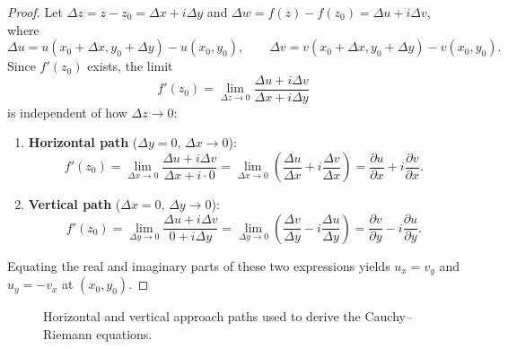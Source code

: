 \documentclass[11pt,a4paper]{article}
\theoremstyle{breakdef}
\theoremstyle{breakthm}
\begin{document}
\begin{proof}
Let $\Delta z = z - z_0 = \Delta x + i\Delta y$ and $\Delta w = f(z) - f(z_0) = \Delta u + i\Delta v$, where
\[
    \Delta u = u(x_0 + \Delta x, y_0 + \Delta y) - u(x_0, y_0), \qquad \Delta v = v(x_0 + \Delta x, y_0 + \Delta y) - v(x_0, y_0).
\]
Since $f'(z_0)$ exists, the limit
\[
    f'(z_0) = \lim_{\Delta z \to 0} \frac{\Delta u + i\Delta v}{\Delta x + i\Delta y}
\]
is independent of how $\Delta z \to 0$:
\begin{enumerate}
    \item \textbf{Horizontal path} ($\Delta y = 0$, $\Delta x \to 0$):
    \[
        f'(z_0) = \lim_{\Delta x \to 0} \frac{\Delta u + i\Delta v}{\Delta x + i\cdot 0} = \lim_{\Delta x \to 0} \left(\frac{\Delta u}{\Delta x} + i\frac{\Delta v}{\Delta x}\right) = \frac{\partial u}{\partial x} + i\frac{\partial v}{\partial x}.
    \]
    \item \textbf{Vertical path} ($\Delta x = 0$, $\Delta y \to 0$):
    \[
        f'(z_0) = \lim_{\Delta y \to 0} \frac{\Delta u + i\Delta v}{0 + i\Delta y} = \lim_{\Delta y \to 0} \left(\frac{\Delta v}{\Delta y} - i\frac{\Delta u}{\Delta y}\right) = \frac{\partial v}{\partial y} - i\frac{\partial u}{\partial y}.
    \]
\end{enumerate}
Equating the real and imaginary parts of these two expressions yields $u_x = v_y$ and $u_y = -v_x$ at $(x_0, y_0)$.
\end{proof}

\begin{figure}[H]
\centering
{}
\caption{Horizontal and vertical approach paths used to derive the Cauchy--Riemann equations.}
\end{figure}
\end{document}
